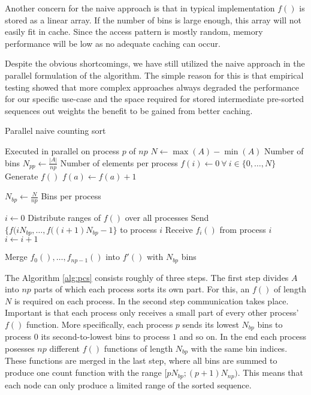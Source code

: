 \documentclass[10pt,a4paper]{article}
\begin{document}
Another concern for the naive approach is that in typical implementation $f()$ is stored as a linear array. If the number of bins is large enough, this array will not easily fit in cache. Since the access pattern is mostly random, memory performance will be low as no adequate caching can occur.  

Despite the obvious shortcomings, we have still utilized the naive approach in the parallel formulation of the algorithm. The simple reason for this is that empirical testing showed that more complex approaches always degraded the performance for our specific use-case and the space required for stored intermediate pre-sorted sequences out weights the benefit to be gained from better caching.  

\begin{algorithm}
\caption{Parallel naive counting sort}
\label{alg:pcs}
\begin{algorithmic}
 \Comment Executed in parallel on process $p$ of $np$
\State $N \gets \max(A)-\min(A)$ \Comment Number of bins
\State $N_{pp} \gets \frac{|A|}{np}$ \Comment Number of elements per process
\State $f(i) \gets 0 \ \forall \ i \in \{0,\dots,N\}$
\Comment Generate $f()$
	\State $f(a) \gets f(a) + 1$ 
\EndFor

\State $N_{bp} \gets \frac{N}{np}$ \Comment Bins per process


\State $i \gets 0$
	\Comment Distribute ranges of $f()$ over all processes
	\State Send $\{f(iN_{bp},\dots,f((i+1)N_{bp}-1\}$ to process $i$
	\State Receive $f_i()$ from process $i$
	\State $i \gets i + 1$
\EndWhile

\State Merge $f_0(),\dots,f_{np-1}()$ into $f'()$ with $N_{bp}$ bins
\EndFunction
\end{algorithmic}
\end{algorithm}

The Algorithm \ref{alg:pcs} consists roughly of three steps. The first step divides $A$ into $np$ parts of which each process sorts its own part. For this, an $f()$ of length $N$ is required on each process. In the second step communication takes place. Important is that each process only receives a small part of every other process' $f()$ function. More specifically, each process $p$ sends its lowest $N_{bp}$ bins to process 0 its second-to-lowest bins to process $1$ and so on. In the end each process posesses $np$ different $f()$ functions of length $N_{bp}$ with the same bin indices. These functions are merged in the last step, where all bins are summed to produce one count function with the range $[pN_{bp}; (p+1)N_{np})$. This means that each node can only produce a limited range of the sorted sequence.
\end{document}
